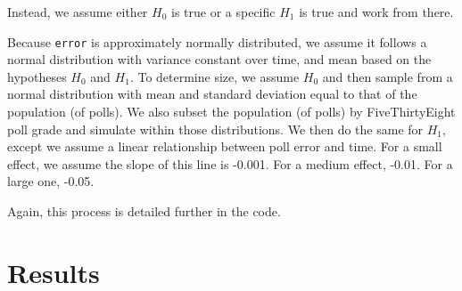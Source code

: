 \documentclass[11pt, oneside]{article}
\newcommand \Rcode[1]{{\texttt{\colorbox{codegray}{#1}}}}
\begin{document}
Instead, we assume either $H_0$ is true or a specific $H_1$ is true and work from there. 

Because \Rcode{error} is approximately normally distributed, we assume it follows a normal distribution with variance constant over time, and mean based on the hypotheses $H_0$ and $H_1$. To determine size, we assume $H_0$ and then sample from a normal distribution with mean and standard deviation equal to that of the population (of polls). We also subset the population (of polls) by FiveThirtyEight poll grade and simulate within those distributions. We then do the same for $H_1$, except we assume a linear relationship between poll error and time. For a small effect, we assume the slope of this line is -0.001. For a medium effect, -0.01. For a large one, -0.05. 

Again, this process is detailed further in the code. 


\section{Results}

\end{document}
